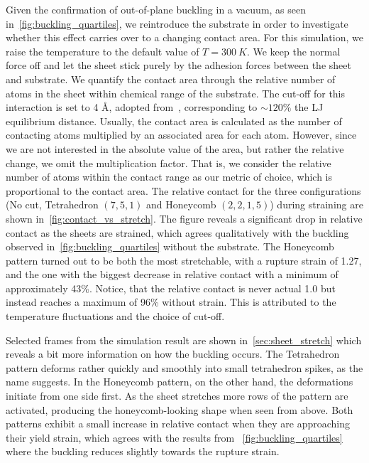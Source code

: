 Given the confirmation of out-of-plane buckling in a vacuum, as seen
in~\cref{fig:buckling_quartiles}, we reintroduce the substrate in order to
investigate whether this effect carries over to a changing contact area. For
this simulation, we raise the temperature to the default value of $T
=\SI{300}{K}$. We keep the normal force off and let the sheet stick purely by
the adhesion forces between the sheet and substrate. We quantify the contact
area through the relative number of atoms in the sheet within chemical range of
the substrate. The cut-off for this interaction is set to 4 Å, adopted
from~\cite{li_evolving_2016}, corresponding to $\sim 120\%$ the \acrshort{LJ}
equilibrium distance. Usually, the contact area is calculated as the number of
contacting atoms multiplied by an associated area for each atom. However, since
we are not interested in the absolute value of the area, but rather the relative
change, we omit the multiplication factor. That is, we consider the relative
number of atoms within the contact range as our metric of choice, which is
proportional to the contact area. The relative contact for the three
configurations (No cut, Tetrahedron $(7,5,1)$ and Honeycomb $(2,2,1,5)$) during
straining are shown in~\cref{fig:contact_vs_stretch}. The figure reveals
a significant drop in relative contact as the sheets are strained, which agrees
qualitatively with the buckling observed in~\cref{fig:buckling_quartiles}
without the substrate. The Honeycomb pattern turned out to be both the most
stretchable, with a rupture strain of 1.27, and the one with the biggest
decrease in relative contact with a minimum of approximately 43\%. Notice, that
the relative contact is never actual 1.0 but instead reaches a maximum of 96\%
without strain. This is attributed to the temperature fluctuations and the
choice of cut-off. 

Selected frames from the simulation result are shown in~\cref{sec:sheet_stretch}
which reveals a bit more information on how the buckling occurs. The Tetrahedron pattern deforms rather quickly and smoothly into small tetrahedron
spikes, as the name suggests. In the Honeycomb pattern, on the other hand, the
deformations initiate from one side first. As the sheet stretches more rows of
the pattern are activated, producing the honeycomb-looking shape when seen from
above. Both patterns exhibit a small increase in relative contact when they
are approaching their yield strain, which agrees with the results from ~\cref{fig:buckling_quartiles} where the buckling reduces slightly towards the
rupture strain.


